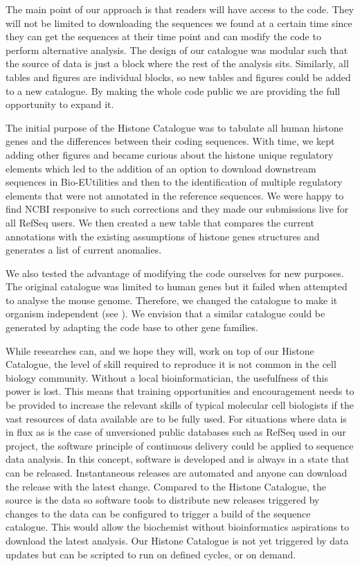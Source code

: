 The main point of our approach is that readers will have access to the
code.  They will not be limited to downloading the sequences we found
at a certain time since
they can get the sequences at their time point and can modify the
code to perform alternative analysis.
The design of our catalogue was
modular such that the source of data is just a block where the rest of the
analysis sits.  Similarly, all tables and figures are individual
blocks, so new tables and figures could be added to a new catalogue.
By making the whole code public we are providing the full opportunity
to expand it.

The initial purpose of the Histone Catalogue
was to tabulate all human histone genes and the differences between
their coding sequences.  With time, we kept adding other figures and became
curious about the histone unique regulatory elements which
led to the addition of an option to download downstream sequences in
Bio-EUtilities and then to the identification of multiple regulatory
elements that were not annotated in the reference sequences.  We were
happy to find NCBI responsive to such corrections and they made
our submissions live for all RefSeq users.
We then created a new table that compares
the current annotations with the existing assumptions of histone genes
structures and generates a list of current anomalies.

We also tested the advantage of modifying the code ourselves for new
purposes.  The original catalogue was limited to human genes but it
failed when attempted to analyse the mouse genome.  Therefore, we changed
the catalogue to make it organism independent (see
).  We envision that a similar catalogue
could be generated by adapting the code base to other gene families.

While researches can, and we hope they will, work on top of our
Histone Catalogue, the level of skill required to reproduce it is not
common in the cell biology community.  Without a local bioinformatician, the
usefulfness of this power is lost.  This means that training
opportunities and encouragement needs to be provided to increase the
relevant skills of typical molecular cell biologists if the vast
resources of data available are to be fully used.
For situations where data is in
flux as is the case of unversioned public databases such as RefSeq
used in our project, the software
principle of continuous delivery could be applied to sequence data
analysis.  In this concept,
software is developed and is always in a state that can be
released.  Instantaneous releases are automated and anyone can download the
release with the latest change.  Compared to the Histone Catalogue, the
source is the data so software tools to distribute new releases
triggered by changes to the data can be configured to
trigger a build of the sequence catalogue.  This would allow the biochemist
without bioinformatics aspirations to download the latest analysis.
Our Histone Catalogue is not yet triggered by data updates but can be
scripted to run on defined cycles, or on demand.


